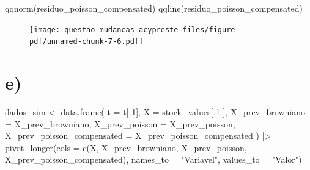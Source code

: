 \documentclass[
  letterpaper,
  DIV=11,
  numbers=noendperiod]{scrreprt}
\newenvironment{Shaded}{\begin{snugshade}}{\end{snugshade}}
\newcommand{\AttributeTok}[1]{\textcolor[rgb]{0.40,0.45,0.13}{#1}}
\newcommand{\DecValTok}[1]{\textcolor[rgb]{0.68,0.00,0.00}{#1}}
\newcommand{\FunctionTok}[1]{\textcolor[rgb]{0.28,0.35,0.67}{#1}}
\newcommand{\NormalTok}[1]{\textcolor[rgb]{0.00,0.23,0.31}{#1}}
\newcommand{\OtherTok}[1]{\textcolor[rgb]{0.00,0.23,0.31}{#1}}
\newcommand{\SpecialCharTok}[1]{\textcolor[rgb]{0.37,0.37,0.37}{#1}}
\newcommand{\StringTok}[1]{\textcolor[rgb]{0.13,0.47,0.30}{#1}}
\begin{document}
\begin{Shaded}
\begin{Highlighting}[]
\FunctionTok{qqnorm}\NormalTok{(residuo\_poisson\_compensated)}
\FunctionTok{qqline}\NormalTok{(residuo\_poisson\_compensated)}
\end{Highlighting}
\end{Shaded}

\begin{figure}[H]

{\centering \texttt{[image: questao-mudancas-acypreste\_files/figure-pdf/unnamed-chunk-7-6.pdf]}

}

\end{figure}

\hypertarget{e}{%
\section*{e)}\label{e}}


\begin{Shaded}
\begin{Highlighting}[]
\NormalTok{dados\_sim }\OtherTok{\textless{}{-}} \FunctionTok{data.frame}\NormalTok{(}
    \AttributeTok{t =}\NormalTok{ t[}\SpecialCharTok{{-}}\DecValTok{1}\NormalTok{],}
    \AttributeTok{X =}\NormalTok{ stock\_values[}\SpecialCharTok{{-}}\DecValTok{1}\NormalTok{ ],}
    \AttributeTok{X\_prev\_browniano =}\NormalTok{ X\_prev\_browniano,}
    \AttributeTok{X\_prev\_poisson =}\NormalTok{ X\_prev\_poisson,}
    \AttributeTok{X\_prev\_poisson\_compensated =}\NormalTok{ X\_prev\_poisson\_compensated}
\NormalTok{) }\SpecialCharTok{|\textgreater{}} 
\FunctionTok{pivot\_longer}\NormalTok{(}\AttributeTok{cols =} \FunctionTok{c}\NormalTok{(X, X\_prev\_browniano, X\_prev\_poisson, X\_prev\_poisson\_compensated),}
             \AttributeTok{names\_to =} \StringTok{"Variavel"}\NormalTok{,}
             \AttributeTok{values\_to =} \StringTok{"Valor"}\NormalTok{) }
\end{Highlighting}
\end{Shaded}
\end{document}
